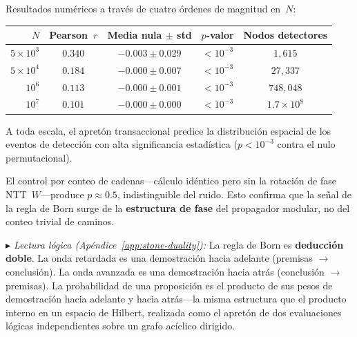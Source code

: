 \documentclass[11pt, a4paper, openany]{book}
\newcommand{\stoneref}[1]{%
  \smallskip\noindent
  {\small\color{structure!70}\textit{$\blacktriangleright$ Lectura
  l\'ogica (Ap\'endice~\ref{app:stone-duality}):} #1}%
  \smallskip}
\begin{document}
\begin{result}[title={La Regla de Born Emerge de la Topolog\'ia Causal}]
\label{res:born-rule}
\noindent Resultados num\'ericos a trav\'es de cuatro \'ordenes de
magnitud en~$N$:

\medskip
\begin{center}
\renewcommand{\arraystretch}{1.2}
\begin{tabular}{rcccc}
\toprule
$N$ & Pearson~$r$ & Media nula $\pm$ std &
  $p$-valor & Nodos detectores \\
\midrule
$5 \times 10^3$   & $0.340$ & $-0.003 \pm 0.029$ &
  $< 10^{-3}$ & $1{,}615$ \\
$5 \times 10^4$   & $0.184$ & $-0.000 \pm 0.007$ &
  $< 10^{-3}$ & $27{,}337$ \\
$10^6$            & $0.113$ & $-0.000 \pm 0.001$ &
  $< 10^{-3}$ & $748{,}048$ \\
$10^7$            & $0.101$ & $-0.000 \pm 0.000$ &
  $< 10^{-3}$ & $1.7 \times 10^8$ \\
\bottomrule
\end{tabular}
\end{center}

\medskip\noindent
A toda escala, el apret\'on transaccional predice la distribuci\'on
espacial de los eventos de detecci\'on con alta significancia
estad\'istica ($p < 10^{-3}$ contra el nulo permutacional).

El control por conteo de cadenas---c\'alculo id\'entico pero sin la
rotaci\'on de fase NTT~$W$---produce $p \approx 0.5$,
indistinguible del ruido. Esto confirma que la se\~nal de la regla de
Born surge de la \textbf{estructura de fase} del propagador modular,
no del conteo trivial de caminos.
\end{result}

\stoneref{La regla de Born es \textbf{deducci\'on doble}. La onda
retardada es una demostraci\'on hacia adelante (premisas $\to$
conclusi\'on). La onda avanzada es una demostraci\'on hacia atr\'as
(conclusi\'on $\to$ premisas). La probabilidad de una proposici\'on es
el producto de sus pesos de demostraci\'on hacia adelante y hacia
atr\'as---la misma estructura que el producto interno en un espacio de
Hilbert, realizada como el apret\'on de dos evaluaciones l\'ogicas
independientes sobre un grafo ac\'iclico dirigido.}

\end{document}
